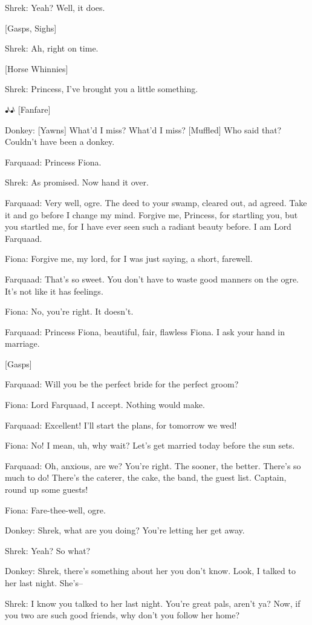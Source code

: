 \documentclass{article}
\begin{document}
Shrek:
Yeah? Well, it does.

[Gasps, Sighs]

Shrek:
Ah, right on time.

[Horse Whinnies]

Shrek:
Princess, I've brought you a little something.

♪♪ [Fanfare]

Donkey:
[Yawns] What'd I miss? What'd I miss? [Muffled] Who said that? Couldn't have been a donkey.

Farquaad:
Princess Fiona.

Shrek:
As promised. Now hand it over.

Farquaad:
Very well, ogre. The deed to your swamp, cleared out, ad agreed. Take it and go before I change my mind. Forgive me, Princess, for startling you, but you startled me, for I have ever seen such a radiant beauty before. I am Lord Farquaad.

Fiona:
Forgive me, my lord, for I was just saying, a short, farewell.

Farquaad:
That's so sweet. You don't have to waste good manners on the ogre. It's not like it has feelings.

Fiona:
No, you're right. It doesn't.

Farquaad:
Princess Fiona, beautiful, fair, flawless Fiona. I ask your hand in marriage.

[Gasps]

Farquaad:
Will you be the perfect bride for the perfect groom?

Fiona:
Lord Farquaad, I accept. Nothing would make.

Farquaad:
Excellent! I'll start the plans, for tomorrow we wed!

Fiona:
No! I mean, uh, why wait? Let's get married today before the sun sets.

Farquaad:
Oh, anxious, are we? You're right. The sooner, the better. There's so much to do! There's the caterer, the cake, the band, the guest list. Captain, round up some guests!

Fiona:
Fare-thee-well, ogre.

Donkey:
Shrek, what are you doing? You're letting her get away.

Shrek:
Yeah? So what?

Donkey:
Shrek, there's something about her you don't know. Look, I talked to her last night. She's--

Shrek:
I know you talked to her last night. You're great pals, aren't ya? Now, if you two are such good friends, why don't you follow her home?
\end{document}
